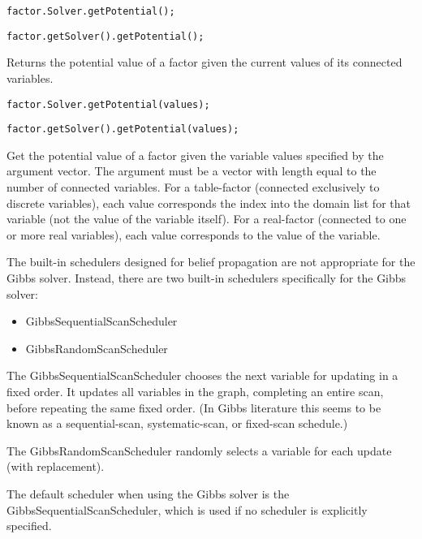 \ifmatlab
\begin{lstlisting}
factor.Solver.getPotential();
\end{lstlisting}
\fi

\ifjava
\begin{lstlisting}
factor.getSolver().getPotential();
\end{lstlisting}
\fi

Returns the potential value of a factor given the current values of its connected variables.

\ifmatlab
\begin{lstlisting}
factor.Solver.getPotential(values);
\end{lstlisting}
\fi

\ifjava
\begin{lstlisting}
factor.getSolver().getPotential(values);
\end{lstlisting}
\fi

Get the potential value of a factor given the variable values specified by the argument vector. The argument must be a vector with length equal to the number of connected variables. For a table-factor (connected exclusively to discrete variables), each value corresponds the index into the domain list for that variable (not the value of the variable itself). For a real-factor (connected to one or more real variables), each value corresponds to the value of the variable.


The built-in schedulers designed for belief propagation are not appropriate for the Gibbs solver.  Instead, there are two built-in schedulers specifically for the Gibbs solver:

\begin{itemize}
\item GibbsSequentialScanScheduler
\item GibbsRandomScanScheduler
\end{itemize}

The GibbsSequentialScanScheduler chooses the next variable for updating in a fixed order. It updates all variables in the graph, completing an entire scan, before repeating the same fixed order. (In Gibbs literature this seems to be known as a sequential-scan, systematic-scan, or fixed-scan schedule.)

The GibbsRandomScanScheduler randomly selects a variable for each update (with replacement).

The default scheduler when using the Gibbs solver is the GibbsSequentialScanScheduler, which is used if no scheduler is explicitly specified.

